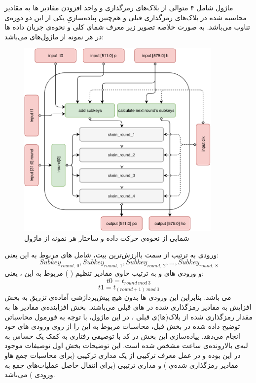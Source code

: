 ماژول 
 شامل ۴ 
 متوالی از بلاک‌های رمزگذاری و واحد افزودن مقادیر 
 ها به مقادیر محاسبه شده در بلاک‌های رمزگذاری قبلی و هم‌چنین پیاده‌سازیِ یکی از این دو دوره‌ی تناوب می‌باشد. 
 به صورت خلاصه تصویر زیر معرف شمای کلی و نحوه‌ی جریان داده ها در هر نمونه از ماژول‌های
 می‌باشد:
 \begin{figure}[H]
 	\centering
 	\includegraphics[width=10cm]{Images/VerilogDocumentation/skeinround_dataflow.pdf}	
 	\caption{شمایی از نحوه‌ی حرکت داده و ساختار هر نمونه از ماژول
 }
 \end{figure}
ورودی 
به ترتیب از سمت با‌ارزش‌ترین بیت، شامل
های مربوط به این 
 یعنی:
 $$Subkey_{round,\ 0}, Subkey_{round,\ 1}, Subkey_{round,\ 2}, ..., Subkey_{round,\ 8}$$
و ورودی های 
و
به ترتیب حاوی مقادیر تنظیم (
)
مربوط به این 
، یعنی:
$$t0 = t_{ round \ mod \ 3 } $$
$$t1 = t_{ (round + 1 ) \ mod \ 3}$$
 می باشد. بنابراین این ورودی ها بدون هیچ پیش‌پردازشی آماده‌ی تزریق به بخش افزایش به مقادیر رمزگذاری شده در 
 های قبلی می‌باشند.  بخش افزاینده‌ی مقادیر 
ها به مقدار رمزگذاری شده از بلاک‌‌(ها)ی قبلی ، در این ماژول،  با توجه به فورمول محاسباتی توضیح داده شده در بخش قبل، محاسبات مربوط به این 
 را از روی ورودی های خود انجام می‌دهد. 
پیاده‌سازی این بخش در کد با توصیفی رفتاری به کمک یک 
حساس به لبه‌ی بالارونده‌ی ساعت مشخص شده است. این توضیحات بخش اول توصیفات موجود در این 
بوده و در عمل معرف ترکیبی از یک مداری ترکیبی (‌برای محاسبات جمع 
ها‌و مقادیر رمزگذاری شده‌ي 
) و مداری ترتیبی (برای انتقال حاصل عملیات‌های جمع به ورودی 
) می‌باشد.

